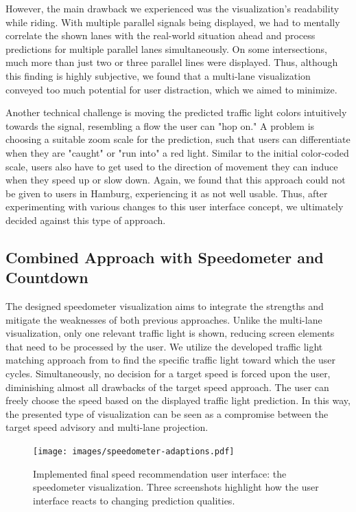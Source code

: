 However, the main drawback we experienced was the visualization's readability while riding. With multiple parallel signals being displayed, we had to mentally correlate the shown lanes with the real-world situation ahead and process predictions for multiple parallel lanes simultaneously. On some intersections, much more than just two or three parallel lines were displayed. Thus, although this finding is highly subjective, we found that a multi-lane visualization conveyed too much potential for user distraction, which we aimed to minimize.

Another technical challenge is moving the predicted traffic light colors intuitively towards the signal, resembling a flow the user can "hop on." A problem is choosing a suitable zoom scale for the prediction, such that users can differentiate when they are "caught" or "run into" a red light. Similar to the initial color-coded scale, users also have to get used to the direction of movement they can induce when they speed up or slow down. Again, we found that this approach could not be given to users in Hamburg, experiencing it as not well usable. Thus, after experimenting with various changes to this user interface concept, we ultimately decided against this type of approach.

\subsection{Combined Approach with Speedometer and Countdown}

The designed speedometer visualization aims to integrate the strengths and mitigate the weaknesses of both previous approaches. Unlike the multi-lane visualization, only one relevant traffic light is shown, reducing screen elements that need to be processed by the user. We utilize the developed traffic light matching approach from  to find the specific traffic light toward which the user cycles. Simultaneously, no decision for a target speed is forced upon the user, diminishing almost all drawbacks of the target speed approach. The user can freely choose the speed based on the displayed traffic light prediction. In this way, the presented type of visualization can be seen as a compromise between the target speed advisory and multi-lane projection.

\begin{figure}[t]
\centering
\texttt{[image: images/speedometer-adaptions.pdf]}
\caption{Implemented final speed recommendation user interface: the speedometer visualization. Three screenshots highlight how the user interface reacts to changing prediction qualities.}
\label{fig:speedometer-adaptions}
\end{figure}

